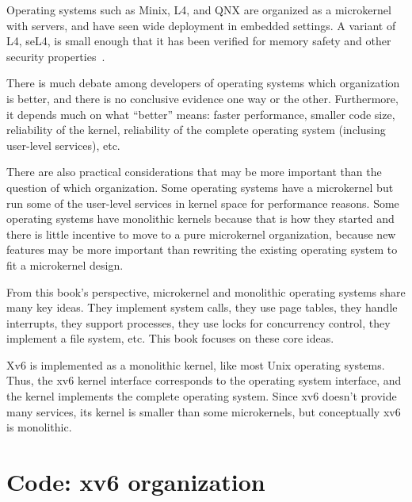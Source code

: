 Operating systems such as Minix, L4, and QNX are organized as a microkernel with
servers, and have seen wide deployment in embedded settings.  A
variant of L4, seL4, is small enough that it has been verified for
memory safety and other security properties~\cite{sel4}.

There is much debate among developers of operating systems which
organization is better, and there is no conclusive evidence one way or
the other.  Furthermore, it depends much on what ``better'' means:
faster performance, smaller code size, reliability of the kernel,
reliability of the complete operating system (inclusing user-level
services), etc.

There are also practical considerations that may be more important
than the question of which organization.  Some operating systems
have a microkernel but run some of the user-level services in kernel
space for performance reasons.  Some operating systems have monolithic
kernels because that is how they started and there is little incentive
to move to a pure microkernel organization, because new features may
be more important than rewriting the existing operating system to fit a microkernel
design.

From this book's perspective, microkernel and monolithic operating
systems share many key ideas.  They implement system calls, they use
page tables, they handle interrupts, they support processes, they use
locks for concurrency control, they implement a file system,
etc. This book focuses on these core ideas.

Xv6 is
implemented as a monolithic kernel, like most Unix operating systems.
Thus, the xv6 kernel interface corresponds to the operating system
interface, and the kernel implements the complete operating system.  Since 
xv6 doesn't provide many services, its kernel is smaller than some
microkernels, but conceptually xv6 is monolithic.  

\section{Code: xv6 organization}

